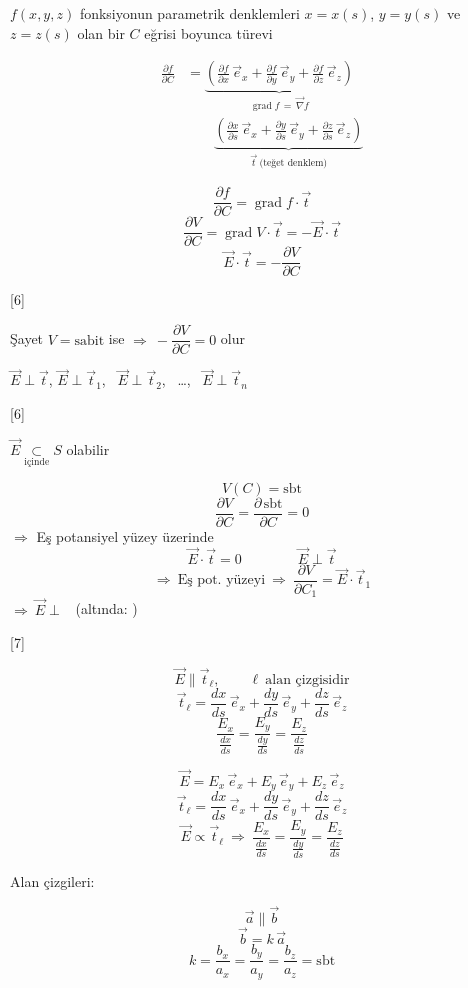 \documentclass[11pt,a4paper]{article}
\begin{document}
\noindent $f(x,y,z)$ fonksiyonun parametrik denklemleri $x = x(s)$, $y = y(s)$ ve $z = z(s)$ olan bir $C$ eğrisi boyunca türevi

\begin{align*}
\frac{\partial f}{\partial C} &= \underbrace{\left(\frac{\partial f}{\partial x}\,\vec e_x + \frac{\partial f}{\partial y}\,\vec e_y + \frac{\partial f}{\partial z}\,\vec e_z\right)}_{\operatorname{grad}f\,=\,\vec\nabla f}\\
&\qquad \underbrace{\left(\frac{\partial x}{\partial s}\,\vec e_x + \frac{\partial y}{\partial s}\,\vec e_y + \frac{\partial z}{\partial s}\,\vec e_z\right)}_{\vec t\ \text{(teğet denklem)}}
\end{align*}

\[ \frac{\partial f}{\partial C} = \operatorname{grad}f\cdot\vec t \]
\[ \frac{\partial V}{\partial C} = \operatorname{grad}V\cdot\vec t = -\vec E\cdot\vec t \]
\[ \vec E\cdot\vec t = -\frac{\partial V}{\partial C} \]

[6]

\noindent Şayet $V = \text{sabit}$ ise $\Rightarrow\ -\dfrac{\partial V}{\partial C} = 0$ olur

\noindent $\vec E\perp\vec t$, \quad $\vec E\perp\vec t_1$, \ $\vec E\perp\vec t_2$, \ \ldots, \ $\vec E\perp\vec t_n$

[6]

\noindent $\vec E \underset{\text{içinde}}{\subset} S$ olabilir

\[ V(C) = \text{sbt} \]
\[ \frac{\partial V}{\partial C} = \frac{\partial\,\text{sbt}}{\partial C} = 0 \]
\noindent $\Rightarrow$ Eş potansiyel yüzey üzerinde
\[ \vec E\cdot\vec t = 0 \qquad\qquad \vec E\perp\vec t \]
\[ \Rightarrow\ \text{Eş pot. yüzeyi}\ \Rightarrow\ \frac{\partial V}{\partial C_1} = \vec E\cdot\vec t_1 \]
\noindent $\Rightarrow\ \vec E \perp$  \ (altında: )

[7]

\[ \vec E \parallel \vec t_\ell, \qquad \ell\ \text{alan çizgisidir} \]
\[ \vec t_\ell = \frac{dx}{ds}\,\vec e_x + \frac{dy}{ds}\,\vec e_y + \frac{dz}{ds}\,\vec e_z \]
\[ \frac{E_x}{\frac{dx}{ds}} = \frac{E_y}{\frac{dy}{ds}} = \frac{E_z}{\frac{dz}{ds}} \]

\[ \vec E = E_x\,\vec e_x + E_y\,\vec e_y + E_z\,\vec e_z \]
\[ \vec t_\ell = \frac{dx}{ds}\,\vec e_x + \frac{dy}{ds}\,\vec e_y + \frac{dz}{ds}\,\vec e_z \]
\[ \vec E \propto \vec t_\ell \ \Rightarrow\ \frac{E_x}{\frac{dx}{ds}} = \frac{E_y}{\frac{dy}{ds}} = \frac{E_z}{\frac{dz}{ds}} \]

\noindent Alan çizgileri:

\[ \vec a \parallel \vec b \]
\[ \vec b = k\,\vec a \]
\[ k = \frac{b_x}{a_x} = \frac{b_y}{a_y} = \frac{b_z}{a_z} = \text{sbt} \]
\end{document}
